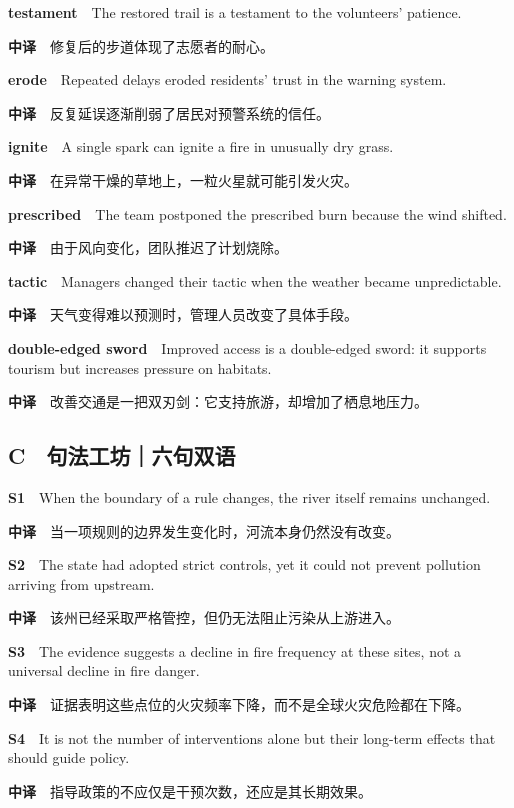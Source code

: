 \documentclass[
  11pt,
]{ctexart}
\begin{document}
\textbf{testament}　The restored trail is a testament to the volunteers'
patience.

\textbf{中译}　修复后的步道体现了志愿者的耐心。

\textbf{erode}　Repeated delays eroded residents' trust in the warning
system.

\textbf{中译}　反复延误逐渐削弱了居民对预警系统的信任。

\textbf{ignite}　A single spark can ignite a fire in unusually dry
grass.

\textbf{中译}　在异常干燥的草地上，一粒火星就可能引发火灾。

\textbf{prescribed}　The team postponed the prescribed burn because the
wind shifted.

\textbf{中译}　由于风向变化，团队推迟了计划烧除。

\textbf{tactic}　Managers changed their tactic when the weather became
unpredictable.

\textbf{中译}　天气变得难以预测时，管理人员改变了具体手段。

\textbf{double-edged sword}　Improved access is a double-edged sword: it
supports tourism but increases pressure on habitats.

\textbf{中译}　改善交通是一把双刃剑：它支持旅游，却增加了栖息地压力。

\subsection{C　句法工坊｜六句双语}\label{c-ux53e5ux6cd5ux5de5ux574aux516dux53e5ux53ccux8bed}

\textbf{S1}　When the boundary of a rule changes, the river itself
remains unchanged.

\textbf{中译}　当一项规则的边界发生变化时，河流本身仍然没有改变。

\textbf{S2}　The state had adopted strict controls, yet it could not
prevent pollution arriving from upstream.

\textbf{中译}　该州已经采取严格管控，但仍无法阻止污染从上游进入。

\textbf{S3}　The evidence suggests a decline in fire frequency at these
sites, not a universal decline in fire danger.

\textbf{中译}　证据表明这些点位的火灾频率下降，而不是全球火灾危险都在下降。

\textbf{S4}　It is not the number of interventions alone but their
long-term effects that should guide policy.

\textbf{中译}　指导政策的不应仅是干预次数，还应是其长期效果。
\end{document}

